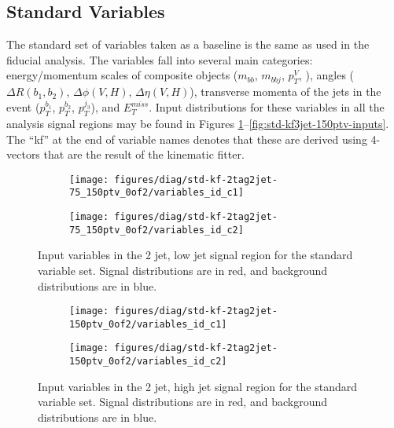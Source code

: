 \subsection{Standard Variables}
The standard set of variables taken as a baseline is the same as used in the fiducial analysis.  The variables fall into several main categories: energy/momentum scales of composite objects ($m_{bb}$, $m_{bbj}$, $p_T^V$, \mll), angles ($\Delta R\left(b_1,b_2\right)$, $\Delta\phi\left(V,H\right)$, $\Delta\eta\left(V,H\right)$), transverse momenta of the jets in the event ($p_T^{b_1}$, $p_T^{b_2}$, $p_T^{j_3}$), and $E_T^{miss}$.  Input distributions for these variables in all the analysis signal regions may be found in Figures \ref{fig:std-kf2jet-75_150ptv-inputs}--\ref{fig:std-kf3jet-150ptv-inputs}.  The ``kf'' at the end of variable names denotes that these are derived using 4-vectors that are the result of the kinematic fitter.
\begin{figure}[!htbp]\captionsetup{justification=centering}
  \centering
\begin{subfigure}[t]{0.49\textwidth}\centering\texttt{[image: figures/diag/std-kf-2tag2jet-75\_150ptv\_0of2/variables\_id\_c1]}\end{subfigure}
\begin{subfigure}[t]{0.49\textwidth}\centering\texttt{[image: figures/diag/std-kf-2tag2jet-75\_150ptv\_0of2/variables\_id\_c2]}\end{subfigure}
  \caption{Input variables in the 2 jet, low jet signal region for the standard variable set.  Signal distributions are in red, and background distributions are in blue.}
  \label{fig:std-kf2jet-75_150ptv-inputs}
\end{figure}

\begin{figure}[!htbp]\captionsetup{justification=centering}
  \centering
\begin{subfigure}[t]{0.49\textwidth}\centering\texttt{[image: figures/diag/std-kf-2tag2jet-150ptv\_0of2/variables\_id\_c1]}\end{subfigure}
\begin{subfigure}[t]{0.49\textwidth}\centering\texttt{[image: figures/diag/std-kf-2tag2jet-150ptv\_0of2/variables\_id\_c2]}\end{subfigure}
  \caption{Input variables in the 2 jet, high jet signal region for the standard variable set.  Signal distributions are in red, and background distributions are in blue.}
  \label{fig:std-kf2jet-150ptv-inputs}
\end{figure}

